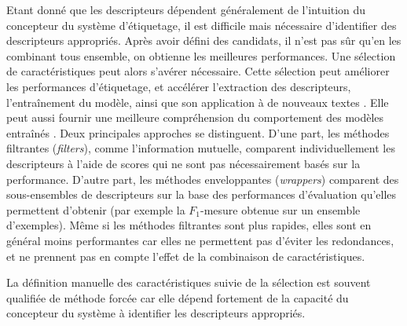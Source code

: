 Etant donné que les descripteurs dépendent généralement de l'intuition du concepteur du système d'étiquetage, il est difficile mais nécessaire d'identifier des descripteurs appropriés. Après avoir défini des candidats, il n'est pas sûr qu'en les combinant tous ensemble, on obtienne les meilleures performances. Une sélection de caractéristiques peut alors s'avérer nécessaire. Cette sélection peut améliorer les performances d'étiquetage, et accélérer l'extraction des descripteurs, l'entraînement du modèle, ainsi que son application à de nouveaux textes \citep{kitoogo2007featureSelectNER}. Elle peut aussi fournir une meilleure compréhension du comportement des modèles entraînés \citep{klinger2009FeaturefilterCRF}. Deux principales approches se distinguent. D'une part, les méthodes \og filtrantes \fg{} (\textit{filters}), comme l'information mutuelle, comparent individuellement les descripteurs à l'aide de scores qui ne sont pas nécessairement basés sur la performance. D'autre part, les méthodes \og enveloppantes \fg{} (\textit{wrappers}) comparent des sous-ensembles de descripteurs sur la base des performances d'évaluation qu'elles permettent d'obtenir (par exemple la $F_1$-mesure obtenue sur un ensemble d'exemples). Même si les méthodes filtrantes sont plus rapides, elles sont en général moins performantes car elles ne permettent pas d'éviter les redondances, et ne prennent pas en compte l'effet de la combinaison de caractéristiques.

La définition manuelle des caractéristiques suivie de la sélection est souvent qualifiée de méthode forcée car elle dépend fortement de la capacité du concepteur du système à identifier les descripteurs appropriés. 


